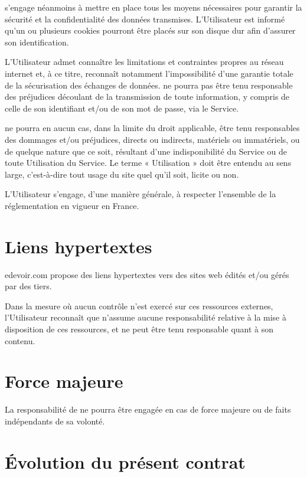 \eDevoir s'engage néanmoins à mettre en place tous les moyens nécessaires pour garantir la sécurité et la confidentialité des données transmises. L'Utilisateur est informé qu'un ou plusieurs cookies pourront être placés sur son disque dur afin d'assurer son identification.

L'Utilisateur admet connaître les limitations et contraintes propres au réseau internet et, à ce titre, reconnaît notamment l'impossibilité d'une garantie totale de la sécurisation des échanges de données. \eDevoir ne pourra pas être tenu responsable des préjudices découlant de la transmission de toute information, y compris de celle de son identifiant et/ou de son mot de passe, via le Service.

\eDevoir ne pourra en aucun cas, dans la limite du droit applicable, être tenu responsables des dommages et/ou préjudices, directs ou indirects, matériels ou immatériels, ou de quelque nature que ce soit, résultant d'une indisponibilité du Service ou de toute Utilisation du Service. Le terme « Utilisation » doit être entendu au sens large, c'est-à-dire tout usage du site quel qu'il soit, licite ou non.

L'Utilisateur s'engage, d'une manière générale, à respecter l'ensemble de la réglementation en vigueur en France.


\section{Liens hypertextes}

edevoir.com propose des liens hypertextes vers des sites web édités et/ou gérés par des tiers.

Dans la mesure où aucun contrôle n'est exercé sur ces ressources externes, l'Utilisateur reconnaît que \eDevoir n'assume aucune responsabilité relative à la mise à disposition de ces ressources, et ne peut être tenu responsable quant à son contenu.


\section{Force majeure}

La responsabilité de \eDevoir ne pourra être engagée en cas de force majeure ou de faits indépendants de sa volonté.


\section{Évolution du présent contrat}

